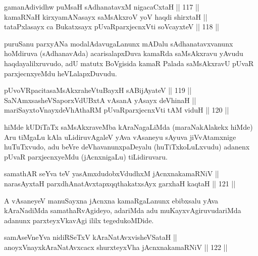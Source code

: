 
\begin{shl}
gamanAdividhw puMsaH sAdhanatavxM nigacaCxtaH \hfill || 117 ||  \\
kamaRNaH kirxyamANasayx saMsAkxroV yoV haqdi shirxtaH || \\
tataPxlasayx ca Bukatxsayx pUvaRparxjecnxVti soVcayxteV \hfill || 118 ||  
\end{shl}

\begin{artha}
puruSanu parxyANa modalAdavugaLanunx mADalu sAdhanatavxvanunx
hoMdiruva (sAdhanavAda) acarisalapxDuva kamaRda saMsAkxravu yAvudu
haqdayalilxruvudo, adU matutx BoVgisida kamaR Palada saMsAkxravU pUvaR
parxjecnxyeMdu heVLalapxDuvudu.
\end{artha}

\begin{shl}
pUvoVRpacitasaMsAkxraheVtuBayxH sA\s BijAyateV \hfill || 119 || \\
SaNAmxsasheVSaporxVdUBxtA vAsanA yA\s sayx deVhinaH || \\
mariSayxtoV\s nayxdeVhAthaRM pUvaRparxjecnxVti tAM viduH \hfill || 120 ||  
\end{shl}

\begin{artha}
hiMde kUDiTaTx saMsAkxraveMba kAraNagaLiMda (maraNakAlakekx hiMde) Aru
tiMgaLu kAla uLidiruvAgaleV yAva vAsaneyu sAyuva jiVvAtamxnige
huTuTxvudo, adu beVre deVhavanunx\break paDeyalu (huTiTxkoLuLxvudu) adanenx
pUvaR parxjecnxyeMdu (jAcnxnigaLu) tiLidiruvaru.
\end{artha}

\begin{shl}
samathAR seYva teV yasAmxdudobxVdudhxM jAcnxnakamaRNiV || \\
narasAyxtaH parxdhAnatAvxtapxqqthakatxsAyx garxhaH kaqtaH \hfill || 121 ||  
\end{shl}

\begin{artha}
A vAsaneyeV manuSayxna jAcnxna kamaRgaLanunx ebibxsalu yAva
kAraNadiMda samathaRvAgideyo, adariMda adu muKayxvAgiruvudariMda
adanunx parxteyxVkavAgi ililx tegedukoMDide.
\end{artha}


\begin{shl}
samAseVneYva nidiRSeTxV kAraNatAvxvisheVSataH || \\
anoyxVnayxkAraNatAvxcacx shurxteyxVha jAcnxnakamaRNiV \hfill || 122 ||  
\end{shl}

